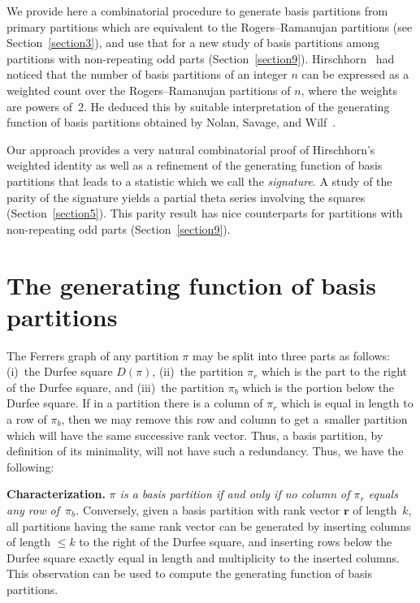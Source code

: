 \documentclass[10pt,a4paper]{amsart}
\numberwithin{equation}{section}
\theoremstyle{definition}
\begin{document}
We provide here a combinatorial procedure to generate basis
partitions from primary partitions which are equivalent to the
Rogers--Ramanujan partitions (see Section~\ref{section3}), and use that for a new study
of basis
partitions among partitions with non-repeating odd parts (Section~\ref{section9}).
Hirschhorn~\cite{Hi0099} had noticed
that the number of basis partitions of an integer $n$ can be expressed
as a weighted count over the Rogers--Ramanujan partitions of $n$, where
the weights are powers of~2. He deduced this by suitable interpretation
of the generating function of basis partitions obtained by Nolan, Savage,
and Wilf~\cite{No-Sa-Wi0098}.

Our approach provides a very natural combinatorial proof of
Hirschhorn's weighted identity
as well as a refinement of the generating function of basis
partitions that leads to a statistic which we call the {\it signature}.
A study of the parity of the signature yields a partial theta series involving
the squares (Section~\ref{section5}). This parity result has nice
counterparts for partitions with non-repeating odd parts (Section~\ref{section9}).

\section{The generating function of basis partitions}\label{section2}

The Ferrers graph of any partition $\pi$ may be split into three
parts as follows: (i)~the Durfee square $D(\pi)$, (ii)~the partition
$\pi_r$ which is the part to the right of the Durfee square, and
(iii)~the partition $\pi_b$ which is the portion below the Durfee
square. If in a partition there is a column of $\pi_r$ which is
equal in length to a row of $\pi_b$, then we may remove this
row and column to get a~smaller partition which will have the
same successive rank vector. Thus, a basis partition, by definition
of its minimality, will not have such a redundancy. Thus, we have
the following:

{\bf Characterization.} \textit{$\pi$ is a basis partition
if and only if no column of $\pi_r$ equals any row of~$\pi_b$.}
Conversely, given a basis partition with rank vector $\mathbf{r}$
of length~$k$, all partitions having the same rank vector can be
generated by inserting columns of length $\le k$ to the right of
the Durfee square, and inserting rows below the Durfee square
exactly equal in length and multiplicity to the inserted columns.
This observation can be used to compute the generating function
of basis partitions.
\end{document}
